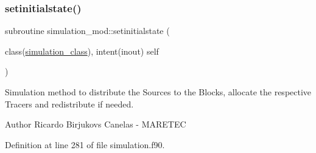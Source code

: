\subsubsection{\texorpdfstring{setinitialstate()}{setinitialstate()}}
{\footnotesize\ttfamily subroutine simulation\+\_\+mod\+::setinitialstate (\begin{DoxyParamCaption}\item[{class(\mbox{\hyperlink{structsimulation__mod_1_1simulation__class}{simulation\+\_\+class}}), intent(inout)}]{self }\end{DoxyParamCaption})\hspace{0.3cm}{\ttfamily [private]}}



Simulation method to distribute the Sources to the Blocks, allocate the respective Tracers and redistribute if needed. 

\begin{DoxyAuthor}{Author}
Ricardo Birjukovs Canelas -\/ M\+A\+R\+E\+T\+EC 
\end{DoxyAuthor}


Definition at line 281 of file simulation.\+f90.


